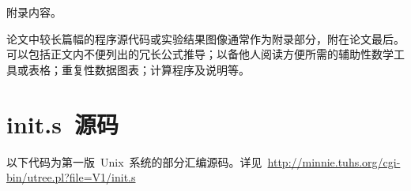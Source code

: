 
	附录内容。
	
	论文中较长篇幅的程序源代码或实验结果图像通常作为附录部分，附在论文最后。可以包括正文内不便列出的冗长公式推导；以备他人阅读方便所需的辅助性数学工具或表格；重复性数据图表；计算程序及说明等。

\section*{init.s~源码}
	以下代码为第一版~Unix~系统的部分汇编源码。详见~\url{http://minnie.tuhs.org/cgi-bin/utree.pl?file=V1/init.s}


	
	
	